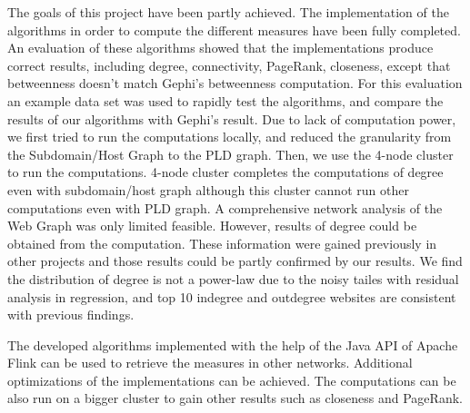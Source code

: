 The goals of this project have been partly achieved. The implementation of the algorithms in order to compute the different measures have been fully completed. An evaluation of these algorithms showed that the implementations produce correct results, including degree, connectivity, PageRank, closeness, except that betweenness doesn't match Gephi's betweenness computation. For this evaluation an example data set was used to rapidly test the algorithms, and compare the results of our algorithms with Gephi's result. Due to lack of computation power, we first tried to run the computations locally, and reduced the granularity from the Subdomain/Host Graph to the PLD graph. Then, we use the 4-node cluster to run the computations. 4-node cluster completes the computations of degree even with subdomain/host graph although this cluster cannot run other computations even with PLD graph. A comprehensive network analysis of the Web Graph was only limited feasible. However, results of degree could be obtained from the computation. These information were gained previously in other projects and those results could be partly confirmed by our results. We find the distribution of degree is not a power-law due to the noisy tailes with residual analysis in regression, and top 10 indegree and outdegree websites are consistent with previous findings.

The developed algorithms implemented with the help of the Java API of Apache Flink can be used to retrieve the measures in other networks. Additional optimizations of the implementations can be achieved. The computations can be also run on a bigger cluster to gain other results such as closeness and PageRank. 
